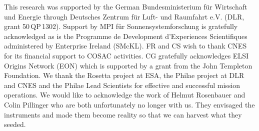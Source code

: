 \documentclass{aa}
\begin{document}
This research was supported by 
the German Bundesministerium f\"ur Wirtschaft und Energie through Deutsches
Zentrum f\"ur Luft- und Raumfahrt e.V. (DLR, grant 50\,QP\,1302). Support by MPI f\"ur Sonnensystemforschung
is gratefully acknowledged as is the Programme de Development d'Exper\-iences Scientifiques administered by Enterprise Ireland (SMcKL).  FR and CS wish to thank CNES for its financial support to COSAC activities. CG gratefully acknowledges ELSI Origins Network (EON) which is supported 
by a grant from the John Templeton Foundation. We thank the Rosetta project at ESA, the Philae project 
at DLR and CNES and the Philae Lead Scientists for effective and successful mission operations. We would like to acknowledge the work of Helmut Rosenbauer and Colin Pillinger who are both unfortunately no longer with us. They envisaged the instruments and made them become reality so that we can harvest what they seeded.





%

\end{document}
